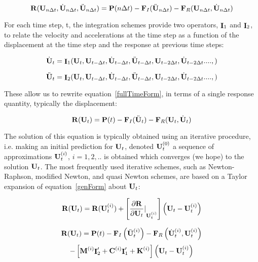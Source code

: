 \begin{equation}
{\bf R}({\bf U}_{n \Delta t},\dot{\bf U}_{n \Delta t}, \ddot{\bf U}_{n \Delta t}) = {\bf P}(n \Delta t) -
{\bf F}_I(\ddot{\bf U}_{n \Delta t}) - {\bf F}_R({\bf U}_{n \Delta t}, \dot{\bf U}_{n \Delta t})
\label{fullTimeForm}
\end{equation}

For each time step, t, the integration schemes provide two operators,
$\mathop{\cal {\bf I}}_1$ and $\mathop{\cal {\bf I}}_2$, to relate the velocity and accelerations at the 
time step as a function of the displacement at the time step and the
response at previous time steps: 

\begin{equation} 
\dot {{\bf U}}_{t} = {\mathop{\cal {\bf I}}}_1 ({\bf U}_t, {\bf U}_{t-\Delta t}, \dot {{\bf U}}_{t-\Delta t},
\ddot {{\bf U}}_{t - \Delta t}, {\bf U}_{t - 2\Delta t}, \dot {{\bf U}}_{t - 2 \Delta t}. ..., )
\label{I1}
\end{equation} 

\begin{equation} 
\ddot {{\bf U}}_{t} = {\mathop{\cal {\bf I}}}_2 ({\bf U}_t, {\bf U}_{t-\Delta t}, \dot {{\bf U}}_{t-\Delta t},
\ddot {{\bf U}}_{t - \Delta t}, {\bf U}_{t - 2\Delta t}, \dot {{\bf U}}_{t - 2 \Delta t}. ..., )
\label{I2}
\end{equation} 

These allow us to rewrite equation~\ref{fullTimeForm}, in terms of a
single response quantity, typically the displacement:

\begin{equation}
{\bf R}({\bf U}_t) = {\bf P}(t) - {\bf F}_I(\ddot{\bf U}_t) - {\bf F}_R({\bf U}_t, \dot{\bf U}_t)
\label{genForm}
\end{equation}

The solution of this equation is typically obtained using an iterative
procedure, i.e. making an initial prediction for ${\bf U}_{t}$,
denoted ${\bf U}_{t}^{(0)}$ a sequence of approximations ${\bf U}_{t}^{(i)}$,
$i=1,2, ..$ is obtained which converges (we hope) to the solution ${\bf U}_{t}$. The
most frequently used iterative schemes, such as Newton-Raphson,
modified Newton, and quasi Newton schemes, are based on a Taylor
expansion of equation~\ref{genForm} about ${\bf U}_{t}$:    

\begin{equation} 
{\bf R}({\bf U}_{t}) = 
{\bf R}({\bf U}_{t}^{(i)}) +
\left[ {\frac{\partial {\bf R}}{\partial {\bf U}_t} \vert}_{{\bf U}_{t}^{(i)}}\right]
\left( {\bf U}_{t} - {\bf U}_{t}^{(i)} \right) 
\end{equation}

$$
{\bf R}({\bf U}_{t}) = 
 {\bf P} (t) 
 - {\bf F}_{I} \left( \ddot {{\bf U}}_{t}^{(i)} \right) -
{\bf F}_{R} \left( \dot {{\bf U}}_{t}^{(i)}, {\bf U}_{t}^{(i)} \right)
$$
\begin{equation} 
- \left[
   {\bf M}^{(i)} {\mathop{\cal {\bf I}}}_2'
+  {\bf C}^{(i)} {\mathop{\cal {\bf I}}}_1'
+ {\bf K}^{(i)}  \right]
 \left( {\bf U}_{t} - {\bf U}_{t}^{(i)} \right)
\label{femGenFormTaylor}
\end{equation} 

